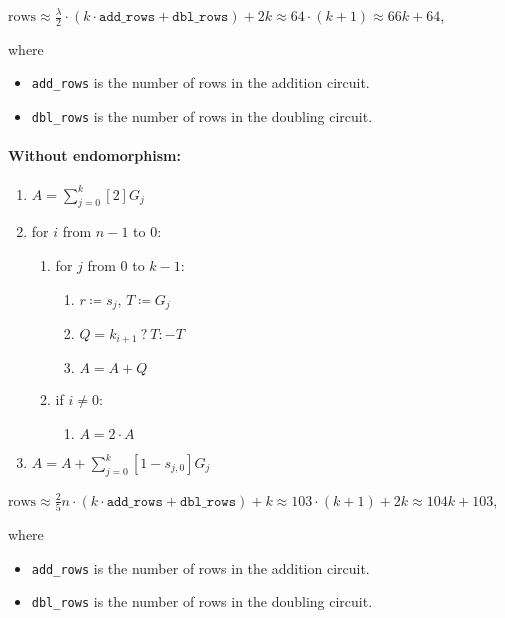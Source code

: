 \begin{center}
    $\text{rows} \approx \frac{\lambda}{2} \cdot (k \cdot \texttt{add\_rows} + \texttt{dbl\_rows}) + 2k \approx 64 \cdot (k + 1) \approx 66k + 64$,
\end{center}
where
\begin{itemize}
    \item \texttt{add\_rows} is the number of rows in the addition circuit.
    \item \texttt{dbl\_rows} is the number of rows in the doubling circuit.
\end{itemize}

\paragraph{Without endomorphism:}

\begin{enumerate}
    \item $A = \sum\limits_{j = 0}^{k} [2]G_j$
    \item for $i$ from $n - 1$ to $0$:
    \begin{enumerate}
        \item for $j$ from $0$ to $k-1$:
        \begin{enumerate}
            \item $r \coloneqq s_j$, $T \coloneqq G_j$
            \item $Q = k_{i + 1} \: ? \: T : -T$
            \item $A = A + Q$
        \end{enumerate}
        \item if $i \neq 0$:
        \begin{enumerate}
            \item $A = 2 \cdot A$
        \end{enumerate}
    \end{enumerate}
    \item $A = A + \sum\limits_{j = 0}^{k} [1 - s_{j, 0}]G_j$
\end{enumerate}

\begin{center}
    $\text{rows} \approx \frac{2}{5}n \cdot (k \cdot \texttt{add\_rows} + \texttt{dbl\_rows}) + k \approx 103 \cdot (k + 1) + 2k \approx 104k + 103$,
\end{center}
where
\begin{itemize}
    \item \texttt{add\_rows} is the number of rows in the addition circuit.
    \item \texttt{dbl\_rows} is the number of rows in the doubling circuit.
\end{itemize}